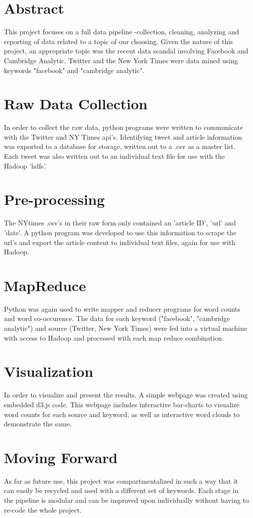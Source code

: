 \documentclass[11pt]{article}
\begin{document}
\section{Abstract}
\noindent This project focuses on a full data pipeline -collection, cleaning, analyzing and reporting of
data related to a topic of our choosing.  Given the nature of this project, an appropriate topic was the recent data scandal involving
Facebook and Cambridge Analytic.  Twitter and the New York Times were data mined using keywords "facebook" and
"cambridge analytic".

\section{Raw Data Collection}

In order to collect the raw data, python programs were written to communicate with the Twitter and NY Times api's.  Identifying tweet and
article information was exported to a database for storage, written out to a .csv as a master list.  Each tweet was also written out to
an individual text file for use with the Hadoop 'hdfs'.

\section{Pre-processing}

The NYtimes .csv's in their raw form only contained an 'article ID', 'url' and 'date'.  A python program was developed to use this information
to scrape the url's and export the article content to individual text files, again for use with Hadoop.

\section{MapReduce}

Python was again used to write mapper and reducer programs for word counts and word co-occurence.  The data for each keyword
("facebook", "cambridge analytic") and source (Twitter, New York Times) were fed into a virtual machine with access to Hadoop and processed
with each map reduce combination.

\section{Visualization}

In order to visualize and present the results.  A simple webpage was created using embedded d3.js code.  This webpage
includes interactive bar-charts to visualize word counts for each source and keyword, as well as interactive word clouds
to demonstrate the same.

\section{Moving Forward}

As far as future use, this project was compartmentalized in such a way that it can easily be recycled and used with a
different set of keywords.  Each stage in the pipeline is modular and can be improved upon individually without having
to re-code the whole project.
\end{document}
